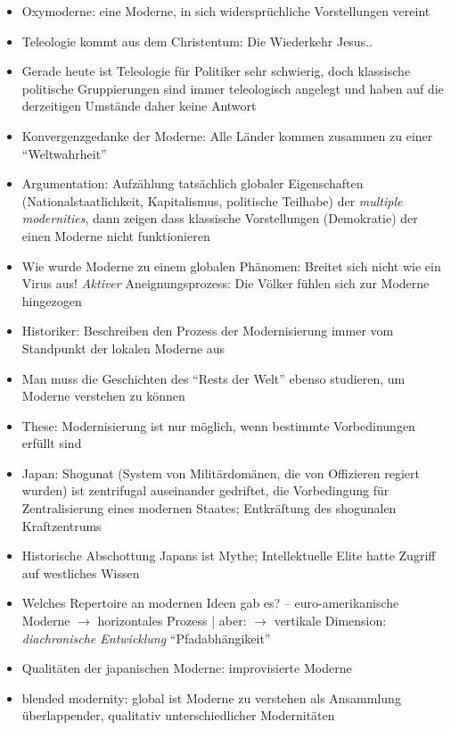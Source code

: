 \documentclass[emulatestandardclasses]{scrartcl}
\begin{document}
\begin{itemize}
  \item Oxymoderne: eine Moderne, in sich widersprüchliche Vorstellungen vereint
  \item Teleologie kommt aus dem Christentum: Die Wiederkehr Jesus..
  \item Gerade heute ist Teleologie für Politiker sehr schwierig, doch klassische politische Gruppierungen sind immer teleologisch angelegt und haben auf die derzeitigen Umstände daher keine Antwort
  \item Konvergenzgedanke der Moderne: Alle Länder kommen zusammen zu einer "`Weltwahrheit"'
  \item Argumentation: Aufzählung tatsächlich globaler Eigenschaften (Nationalstaatlichkeit, Kapitalismus, politische Teilhabe) der \emph{multiple modernities}, dann zeigen dass klassische Vorstellungen (Demokratie) der einen Moderne nicht funktionieren
  \item Wie wurde Moderne zu einem globalen Phänomen: Breitet sich nicht wie ein Virus aus! \emph{Aktiver} Aneignungsprozess: Die Völker fühlen sich zur Moderne hingezogen 
  \item Historiker: Beschreiben den Prozess der Modernisierung immer vom Standpunkt der lokalen Moderne aus
  \item Man muss die Geschichten des "`Rests der Welt"' ebenso studieren, um Moderne verstehen zu können
  \item These: Modernisierung ist nur möglich, wenn bestimmte Vorbedinungen erfüllt sind
  \item Japan: Shogunat (System von Militärdomänen, die von Offizieren regiert wurden) ist zentrifugal auseinander gedriftet, die Vorbedingung für Zentralisierung eines modernen Staates; Entkräftung des shogunalen Kraftzentrums
  \item Historische Abschottung Japans ist Mythe; Intellektuelle Elite hatte Zugriff auf westliches Wissen
  \item Welches Repertoire an modernen Ideen gab es? -- euro-amerikanische Moderne $\rightarrow$ horizontales Prozess | aber: $\rightarrow$ vertikale Dimension: \emph{diachronische Entwicklung} "`Pfadabhängikeit"'
  \item Qualitäten der japanischen Moderne: improvisierte Moderne
  \item blended modernity: global ist Moderne zu verstehen als Ansammlung überlappender, qualitativ unterschiedlicher Modernitäten
\end{itemize}
\end{document}
